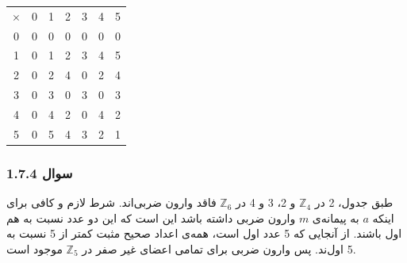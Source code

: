 \documentclass{article}
\begin{document}
\begin{latin}
\begin{table}[H]
\centering
\begin{tabular}{ccccccc}
$\times$               & 0                      & 1                      & 2                      & 3                      & 4                      & 5                      \\ \cline{2-7} 
\multicolumn{1}{c|}{0} & \multicolumn{1}{c|}{0} & \multicolumn{1}{c|}{0} & \multicolumn{1}{c|}{0} & \multicolumn{1}{c|}{0} & \multicolumn{1}{c|}{0} & \multicolumn{1}{c|}{0} \\ \cline{2-7} 
\multicolumn{1}{c|}{1} & \multicolumn{1}{c|}{0} & \multicolumn{1}{c|}{1} & \multicolumn{1}{c|}{2} & \multicolumn{1}{c|}{3} & \multicolumn{1}{c|}{4} & \multicolumn{1}{c|}{5} \\ \cline{2-7} 
\multicolumn{1}{c|}{2} & \multicolumn{1}{c|}{0} & \multicolumn{1}{c|}{2} & \multicolumn{1}{c|}{4} & \multicolumn{1}{c|}{0} & \multicolumn{1}{c|}{2} & \multicolumn{1}{c|}{4} \\ \cline{2-7} 
\multicolumn{1}{c|}{3} & \multicolumn{1}{c|}{0} & \multicolumn{1}{c|}{3} & \multicolumn{1}{c|}{0} & \multicolumn{1}{c|}{3} & \multicolumn{1}{c|}{0} & \multicolumn{1}{c|}{3} \\ \cline{2-7} 
\multicolumn{1}{c|}{4} & \multicolumn{1}{c|}{0} & \multicolumn{1}{c|}{4} & \multicolumn{1}{c|}{2} & \multicolumn{1}{c|}{0} & \multicolumn{1}{c|}{4} & \multicolumn{1}{c|}{2} \\ \cline{2-7} 
\multicolumn{1}{c|}{5} & \multicolumn{1}{c|}{0} & \multicolumn{1}{c|}{5} & \multicolumn{1}{c|}{4} & \multicolumn{1}{c|}{3} & \multicolumn{1}{c|}{2} & \multicolumn{1}{c|}{1} \\ \cline{2-7} 
\end{tabular}
\end{table}
\end{latin}


\subsubsection{سوال 1.7.4}
طبق جدول، 2 در $\mathbb{Z}_4$ و 2، 3 و 4 در $\mathbb{Z}_6$ فاقد وارون ضربی‌اند.\newline
شرط لازم و کافی برای اینکه $a$ به پیمانه‌ی $m$ وارون ضربی داشته باشد این است که این دو عدد نسبت به هم اول باشند. از آنجایی که 5 عدد اول است، همه‌ی اعداد صحیح مثبت کمتر از 5 نسبت به 5 اول‌ند. پس وارون ضربی برای تمامی اعضای غیر صفر در $\mathbb{Z}_5$ موجود است.
\end{document}
